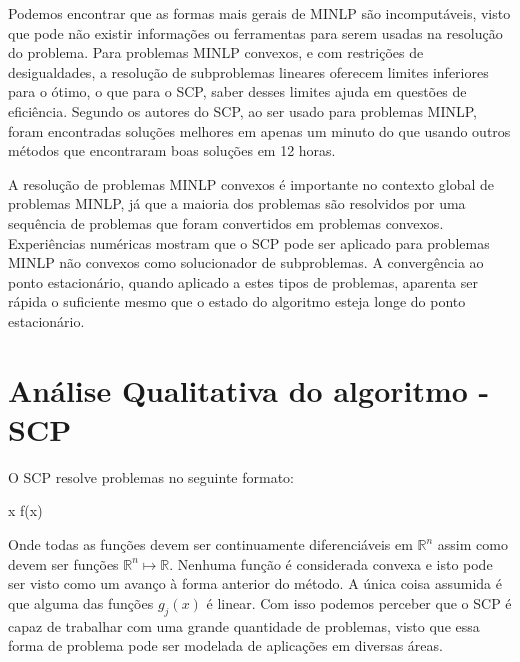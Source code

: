 Podemos encontrar que as formas mais gerais de MINLP são incomputáveis, visto que pode não existir
informações ou ferramentas para serem usadas na resolução do problema. Para problemas MINLP convexos,
e com restrições de desigualdades, a resolução de subproblemas lineares oferecem limites inferiores para
o ótimo, o que para o SCP, saber desses limites ajuda em questões de eficiência. Segundo os autores do
SCP, ao ser usado para problemas MINLP, foram encontradas soluções melhores em apenas um minuto do que
usando outros métodos que encontraram boas soluções em 12 horas.

A resolução de problemas MINLP convexos é importante no contexto global de problemas MINLP, já
que a maioria dos problemas são resolvidos por uma sequência de problemas que foram convertidos em
problemas convexos. Experiências numéricas mostram que o SCP pode ser aplicado para problemas MINLP
não convexos como solucionador de subproblemas. A convergência ao ponto estacionário, quando aplicado
a estes tipos de problemas, aparenta ser rápida o suficiente mesmo que o estado do algoritmo esteja
longe do ponto estacionário.



\section{Análise Qualitativa do algoritmo - SCP}


O SCP resolve problemas no seguinte formato:

\vspace{-15pt}
\begin{mini!}
{x}{ f(x) \label{scp_obj}}{\label{prob_scp}}{}
\end{mini!}

Onde todas as funções devem ser continuamente diferenciáveis em \(\mathbb{R}^n\) assim como
devem ser funções \( \mathbb{R}^n \mapsto \mathbb{R} \). Nenhuma função é considerada convexa e isto
pode ser visto como um avanço à forma anterior do método. A única coisa assumida é que alguma das
funções \( g_j(x) \) é linear. Com isso podemos perceber que o SCP é capaz de trabalhar com uma
grande quantidade de problemas, visto que essa forma de problema pode ser modelada de aplicações
em diversas áreas.

